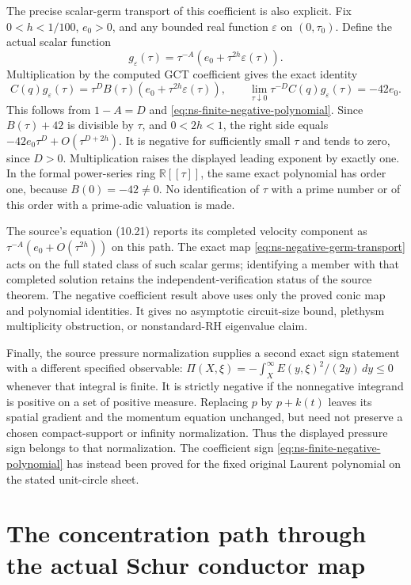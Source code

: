 The precise scalar-germ transport of this coefficient is also explicit.
Fix $0<h<1/100$, $e_0>0$, and any bounded real function
$\varepsilon$ on $(0,\tau_0)$. Define the actual scalar function
\[
 g_\varepsilon(\tau)=\tau^{-A}
          (e_0+\tau^{2h}\varepsilon(\tau)).
\]
Multiplication by the computed GCT coefficient gives the exact identity
\begin{equation}\label{eq:ns-negative-germ-transport}
 C(q)g_\varepsilon(\tau)
 =\tau^D B(\tau)(e_0+\tau^{2h}\varepsilon(\tau)),\qquad
 \lim_{\tau\downarrow0}\tau^{-D}C(q)g_\varepsilon(\tau)=-42e_0.
\end{equation}
This follows from $1-A=D$ and \eqref{eq:ns-finite-negative-polynomial}.
Since $B(\tau)+42$ is divisible by $\tau$, and $0<2h<1$, the
right side equals $-42e_0\tau^D+O(\tau^{D+2h})$.
It is negative for sufficiently small $\tau$ and tends to zero,
since $D>0$. Multiplication raises the displayed leading exponent by
exactly one. In the formal power-series ring $\mathbb R[[\tau]]$,
the same exact polynomial has order one, because $B(0)=-42\ne0$.
No identification of $\tau$ with a prime number or of this order with
a prime-adic valuation is made.

The source's equation (10.21) reports its completed velocity component
as $\tau^{-A}(e_0+O(\tau^{2h}))$ on this path. The exact map
\eqref{eq:ns-negative-germ-transport} acts on the full stated class of
such scalar germs; identifying a member with that completed solution
retains the independent-verification status of the source theorem.
The negative coefficient result above uses only the proved conic map
and polynomial identities. It gives no asymptotic circuit-size bound,
plethysm multiplicity obstruction, or nonstandard-RH eigenvalue claim.

Finally, the source pressure normalization supplies a second exact
sign statement with a different specified observable:
$\Pi(X,\xi)=-\int_X^\infty E(y,\xi)^2/(2y)\,dy\leq0$
whenever that integral is finite. It is strictly negative if the
nonnegative integrand is positive on a set of positive measure.
Replacing $p$ by $p+k(t)$ leaves its spatial gradient and the momentum
equation unchanged, but need not preserve a chosen compact-support or
infinity normalization. Thus the displayed pressure sign belongs to
that normalization. The coefficient sign
\eqref{eq:ns-finite-negative-polynomial} has instead been proved for
the fixed original Laurent polynomial on the stated unit-circle sheet.


\section{The concentration path through the actual Schur conductor map}
\label{sec:ns-schur-path}

